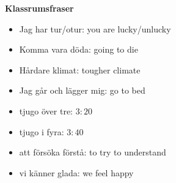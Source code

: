 
\begin{flushleft}
    \textbf{Klassrumsfraser}
    \begin{itemize}
        \item Jag har tur/otur: you are lucky/unlucky
        \item Komma vara döda: going to die
        \item Hårdare klimat: tougher climate
        \item Jag går och lägger mig: go to bed
        \item tjugo över tre: $3:20$
        \item tjugo i fyra: $3:40$
        \item att försöka förstå: to try to understand
        \item vi känner glada: we feel happy
    \end{itemize}
\end{flushleft}

